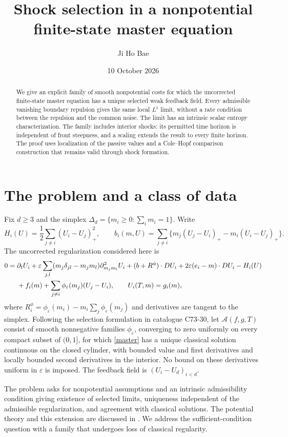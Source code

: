 \documentclass[11pt]{article}
\title{Shock selection in a nonpotential\protect\\ finite-state master equation}
\author{Ji Ho Bae}
\date{10 October 2026}
\begin{document}
\maketitle
\begin{abstract}
We give an explicit family of smooth nonpotential costs for which the uncorrected finite-state master equation has a unique selected weak feedback field. Every admissible vanishing boundary repulsion gives the same local $L^1$ limit, without a rate condition between the repulsion and the common noise. The limit has an intrinsic scalar entropy characterization. The family includes interior shocks: its permitted time horizon is independent of front steepness, and a scaling extends the result to every finite horizon. The proof uses localization of the passive values and a Cole--Hopf comparison construction that remains valid through shock formation.
\end{abstract}

\section{The problem and a class of data}
Fix $d\ge3$ and the simplex $\Delta_d=\{m_i\ge0:\sum_i m_i=1\}$. Write
\[
 H_i(U)=\frac12\sum_{j\ne i}(U_i-U_j)_+^2,\qquad
 b_i(m,U)=\sum_{j\ne i}\{m_j(U_j-U_i)_+-m_i(U_i-U_j)_+\}.
\]
The uncorrected regularization considered here is
\begin{align}\label{master}
0={}&\partial_tU_i+\varepsilon\sum_{j,l}(m_j\delta_{jl}-m_jm_l)\partial^2_{m_jm_l}U_i
 +(b+R^\phi)\cdot DU_i+2\varepsilon(e_i-m)\cdot DU_i-H_i(U)\notag\\
&+f_i(m)+\sum_{j\ne i}\phi_\varepsilon(m_j)(U_j-U_i),\qquad U_i(T,m)=g_i(m),
\end{align}
where $R_i^\phi=\phi_\varepsilon(m_i)-m_i\sum_j\phi_\varepsilon(m_j)$ and derivatives are tangent to the simplex. Following the selection formulation in catalogue C73-30, let $\mathcal A(f,g,T)$ consist of smooth nonnegative families $\phi_\varepsilon$, converging to zero uniformly on every compact subset of $(0,1]$, for which \eqref{master} has a unique classical solution continuous on the closed cylinder, with bounded value and first derivatives and locally bounded second derivatives in the interior. No bound on these derivatives uniform in $\varepsilon$ is imposed. The feedback field is $(U_i-U_d)_{i<d}$.

The problem asks for nonpotential assumptions and an intrinsic admissibility condition giving existence of selected limits, uniqueness independent of the admissible regularization, and agreement with classical solutions. The potential theory and this extension are discussed in \cite[\S4.3--4.4]{CD}. We address the sufficient-condition question with a family that undergoes loss of classical regularity.
\end{document}
